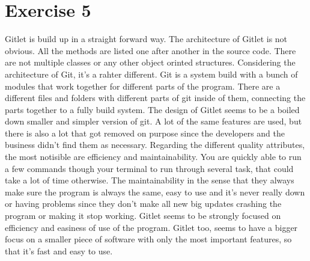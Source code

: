 \section{Exercise 5}
Gitlet is build up in a straight forward way.
The architecture of Gitlet is not obvious. 
All the methods are listed one after another in the source code.
There are not multiple classes or any other object orinted structures. 
Considering the architecture of Git, it’s a rahter different.
Git is a system build with a bunch of modules that work together for different parts of the program.
There are a different files and folders with different parts of git inside of them, connecting the parts together to a fully build system. 
The design of Gitlet seems to be a boiled down smaller and simpler version of git.
A lot of the same features are used, but there is also a lot that got removed on purpose since the developers and the business didn’t find them as necessary. 
Regarding the different quality attributes, the most notisible are efficiency and maintainability. 
You are quickly able to run a few commands though your terminal to run through several task, that could take a lot of time otherwise. 
The maintainability in the sense that they always make sure the program is always the same, easy to use and it’s never really down or having problems since they don’t make all new big updates crashing the program or making it stop working. 
Gitlet seems to be strongly focused on efficiency and easiness of use of the program.
Gitlet too, seems to have a bigger focus on a smaller piece of software with only the most important features, so that it’s fast and easy to use.
